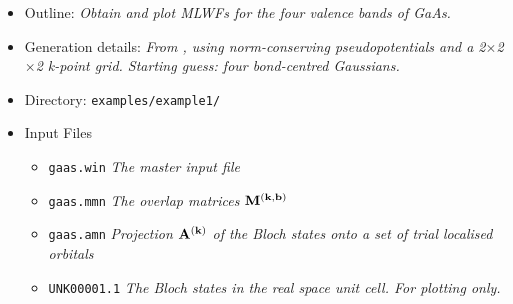 \documentclass[a4paper,11pt,twoside]{article}
\begin{document}
\begin{itemize}
\item{Outline: \it{Obtain and plot MLWFs for the four valence
    bands of GaAs.}} 
\item{Generation details: \it{From \pwscf, using norm-conserving
    pseudopotentials and a 2$\times$2$\times$2 k-point grid. Starting
    guess: four bond-centred Gaussians.}}
\item{Directory: {\tt examples/example1/}}
\item{Input Files}
\begin{itemize}
\item{ {\tt gaas.win}  {\it The master input file}}
\item{ {\tt gaas.mmn}  {\it The overlap matrices $\mathbf{M}^{(\mathbf{k},\mathbf{b})}$}}
\item{ {\tt gaas.amn}  {\it Projection $\mathbf{A}^{(\mathbf{k})}$ of the Bloch states onto a set
    of trial localised orbitals}} 
\item{ {\tt UNK00001.1}  {\it The Bloch states in the real space unit
    cell. For plotting only.}} 
\end{itemize}
\end{itemize}
\end{document}
